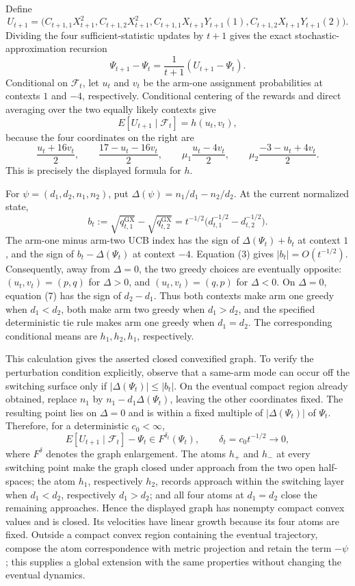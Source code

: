 Define
\[
 U_{t+1}=\bigl(C_{t+1,1}X_{t+1}^2,C_{t+1,2}X_{t+1}^2,
 C_{t+1,1}X_{t+1}Y_{t+1}(1),C_{t+1,2}X_{t+1}Y_{t+1}(2)\bigr).
\]
Dividing the four sufficient-statistic updates by \(t+1\) gives the exact stochastic-approximation recursion
\[
 \Psi_{t+1}-\Psi_t=\frac1{t+1}(U_{t+1}-\Psi_t). \tag{5}
\]
Conditional on \(\mathcal F_t\), let \(u_t\) and \(v_t\) be the arm-one assignment probabilities at contexts \(1\) and \(-4\), respectively.  Conditional centering of the rewards and direct averaging over the two equally likely contexts give
\[
 E[U_{t+1}\mid\mathcal F_t]=h(u_t,v_t), \tag{6}
\]
because the four coordinates on the right are
\[
 \frac{u_t+16v_t}{2},\qquad \frac{17-u_t-16v_t}{2},\qquad
 \mu_1\frac{u_t-4v_t}{2},\qquad
 \mu_2\frac{-3-u_t+4v_t}{2}.
\]
This is precisely the displayed formula for \(h\).

For \(\psi=(d_1,d_2,n_1,n_2)\), put \(\Delta(\psi)=n_1/d_1-n_2/d_2\).  At the current normalized state,
\[
 b_t:=\sqrt{q^{\mathrm{GX}}_{t,1}}-\sqrt{q^{\mathrm{GX}}_{t,2}}
 =t^{-1/2}\bigl(d_{t,1}^{-1/2}-d_{t,2}^{-1/2}\bigr). \tag{7}
\]
The arm-one minus arm-two UCB index has the sign of \(\Delta(\Psi_t)+b_t\) at context \(1\), and the sign of \(b_t-\Delta(\Psi_t)\) at context \(-4\).  Equation (3) gives \(|b_t|=O(t^{-1/2})\).  Consequently, away from \(\Delta=0\), the two greedy choices are eventually opposite: \((u_t,v_t)=(p,q)\) for \(\Delta>0\), and \((u_t,v_t)=(q,p)\) for \(\Delta<0\).  On \(\Delta=0\), equation (7) has the sign of \(d_2-d_1\).  Thus both contexts make arm one greedy when \(d_1<d_2\), both make arm two greedy when \(d_1>d_2\), and the specified deterministic tie rule makes arm one greedy when \(d_1=d_2\).  The corresponding conditional means are \(h_1,h_2,h_1\), respectively.

This calculation gives the asserted closed convexified graph.  To verify the perturbation condition explicitly, observe that a same-arm mode can occur off the switching surface only if \(|\Delta(\Psi_t)|\leq |b_t|\).  On the eventual compact region already obtained, replace \(n_1\) by \(n_1-d_1\Delta(\Psi_t)\), leaving the other coordinates fixed.  The resulting point lies on \(\Delta=0\) and is within a fixed multiple of \(|\Delta(\Psi_t)|\) of \(\Psi_t\).  Therefore, for a deterministic \(c_0<\infty\),
\[
 E[U_{t+1}\mid\mathcal F_t]-\Psi_t\in F^{\delta_t}(\Psi_t),
 \qquad \delta_t=c_0t^{-1/2}\longrightarrow0, \tag{8}
\]
where \(F^\delta\) denotes the graph enlargement.  The atoms \(h_+\) and \(h_-\) at every switching point make the graph closed under approach from the two open half-spaces; the atom \(h_1\), respectively \(h_2\), records approach within the switching layer when \(d_1<d_2\), respectively \(d_1>d_2\); and all four atoms at \(d_1=d_2\) close the remaining approaches.  Hence the displayed graph has nonempty compact convex values and is closed.  Its velocities have linear growth because its four atoms are fixed.  Outside a compact convex region containing the eventual trajectory, compose the atom correspondence with metric projection and retain the term \(-\psi\); this supplies a global extension with the same properties without changing the eventual dynamics.

